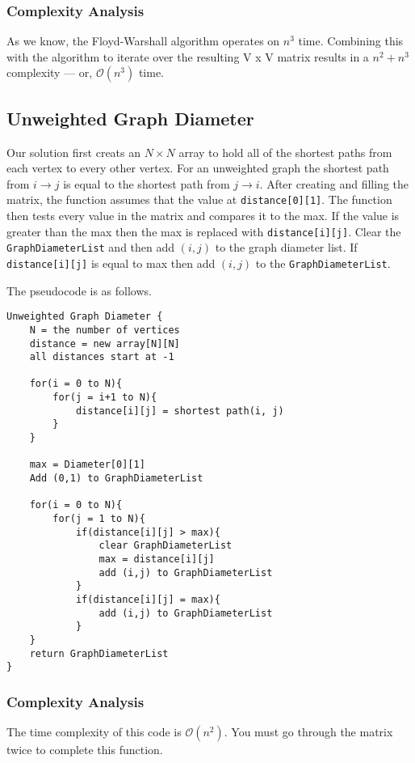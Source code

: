 \documentclass{article}
\begin{document}
\subsubsection{Complexity Analysis}
As we know, the Floyd-Warshall algorithm operates on $n^3$ time. Combining this with the algorithm to iterate over the resulting V x V matrix results in a $n^2 + n^3$ complexity --- or, $\mathcal{O}(n^3)$ time.

\subsection{Unweighted Graph Diameter}
Our solution first creats an $N \times N$ array to hold all of the shortest paths from each vertex to every other
vertex. For an unweighted graph the shortest path from $i \rightarrow j$ is equal to the shortest path from $j \rightarrow i$. After creating and filling the matrix, the function assumes that the value at \texttt{distance[0][1]}. The function then tests every value in the matrix and compares it to the max. If the value is greater than the max then the max is replaced
with \texttt{distance[i][j]}. Clear the \texttt{GraphDiameterList} and then add $(i,j)$ to the graph diameter list. If \texttt{distance[i][j]} is equal to max then add $(i,j)$ to the \texttt{GraphDiameterList}.

The pseudocode is as follows.

\begin{verbatim}
Unweighted Graph Diameter {
    N = the number of vertices
    distance = new array[N][N]
    all distances start at -1

    for(i = 0 to N){
        for(j = i+1 to N){
            distance[i][j] = shortest path(i, j)
        }
    }

    max = Diameter[0][1]
    Add (0,1) to GraphDiameterList

    for(i = 0 to N){
        for(j = 1 to N){
            if(distance[i][j] > max){
                clear GraphDiameterList
                max = distance[i][j]
                add (i,j) to GraphDiameterList
            }
            if(distance[i][j] = max){
                add (i,j) to GraphDiameterList
            }
    }
    return GraphDiameterList
}
\end{verbatim}

\subsubsection{Complexity Analysis}
The time complexity of this code is $\mathcal{O}(n^2)$. You must go through the matrix twice to complete this function.
\end{document}
